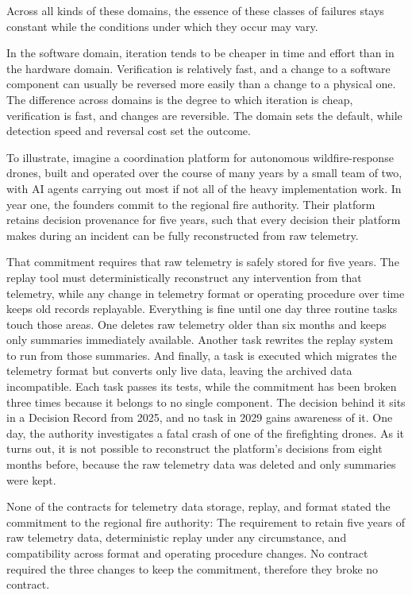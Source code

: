 Across all kinds of these domains, the essence of these classes of failures stays constant while the conditions under which they occur may vary.

In the software domain, iteration tends to be cheaper in time and effort than in the hardware domain. Verification is relatively fast, and a change to a software component can usually be reversed more easily than a change to a physical one. The difference across domains is the degree to which iteration is cheap, verification is fast, and changes are reversible. The domain sets the default, while detection speed and reversal cost set the outcome.

To illustrate, imagine a coordination platform for autonomous wildfire-response drones, built and operated over the course of many years by a small team of two, with AI agents carrying out most if not all of the heavy implementation work. In year one, the founders commit to the regional fire authority. Their platform retains decision provenance for five years, such that every decision their platform makes during an incident can be fully reconstructed from raw telemetry.

That commitment requires that raw telemetry is safely stored for five years. The replay tool must deterministically reconstruct any intervention from that telemetry, while any change in telemetry format or operating procedure over time keeps old records replayable. Everything is fine until one day three routine tasks touch those areas. One deletes raw telemetry older than six months and keeps only summaries immediately available. Another task rewrites the replay system to run from those summaries. And finally, a task is executed which migrates the telemetry format but converts only live data, leaving the archived data incompatible. Each task passes its tests, while the commitment has been broken three times because it belongs to no single component. The decision behind it sits in a Decision Record from 2025, and no task in 2029 gains awareness of it. One day, the authority investigates a fatal crash of one of the firefighting drones. As it turns out, it is not possible to reconstruct the platform's decisions from eight months before, because the raw telemetry data was deleted and only summaries were kept.

None of the contracts for telemetry data storage, replay, and format stated the commitment to the regional fire authority: The requirement to retain five years of raw telemetry data, deterministic replay under any circumstance, and compatibility across format and operating procedure changes. No contract required the three changes to keep the commitment, therefore they broke no contract.

